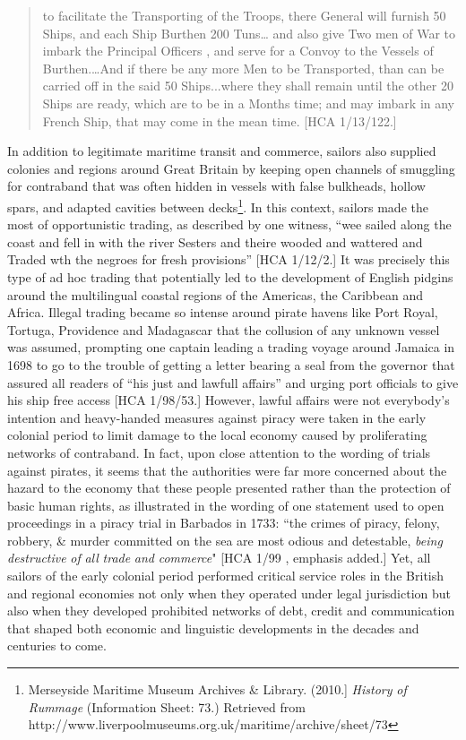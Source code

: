 \begin{quotation}
to facilitate the Transporting of the Troops, there General will furnish 50 Ships, and each Ship Burthen 200 Tuns… and also give Two men of War to imbark the Principal Officers , and serve for a Convoy to the Vessels of Burthen.…And if there be any more Men to be Transported, than can be carried off in the said 50 Ships...where they shall remain until the other 20 Ships are ready, which are to be in a Months time; and may imbark in any French Ship, that may come in the mean time. [HCA 1/13/122.]\end{quotation}

In addition to legitimate maritime transit and commerce, sailors also supplied colonies and regions around Great Britain by keeping open channels of smuggling for contraband that was often hidden in vessels with false bulkheads, hollow spars, and adapted cavities between decks\footnote{Merseyside Maritime Museum Archives \& Library. (2010.]  \textit{History} \textit{of} \textit{Rummage} (Information Sheet: 73.) Retrieved from http://www.liverpoolmuseums.org.uk/maritime/archive/sheet/73}. In this context, sailors made the most of opportunistic trading, as described by one witness, “wee sailed along the coast and fell in with the river Sesters and theire wooded and wattered and Traded wth the negroes for fresh provisions” [HCA 1/12/2.] It was precisely this type of ad hoc trading that potentially led to the development of English pidgins around the multilingual coastal regions of the Americas, the Caribbean and Africa. Illegal trading became so intense around pirate havens like Port Royal, Tortuga, Providence and Madagascar that the collusion of any unknown vessel was assumed, prompting one captain leading a trading voyage around Jamaica in 1698 to go to the trouble of getting a letter bearing a seal from the governor that assured all readers of “his just and lawfull affairs” and urging port officials to give his ship free access [HCA 1/98/53.] However, lawful affairs were not everybody’s intention and heavy-handed measures against piracy were taken in the early colonial period to limit damage to the local economy caused by proliferating networks of contraband. In fact, upon close attention to the wording of trials against pirates, it seems that the authorities were far more concerned about the hazard to the economy that these people presented rather than the protection of basic human rights, as illustrated in the wording of one statement used to open proceedings in a piracy trial in Barbados in 1733: “the crimes of piracy, felony, robbery, \& murder committed on the sea are most odious and detestable, \textit{being} \textit{destructive} \textit{of} \textit{all} \textit{trade} \textit{and} \textit{commerce}" [HCA 1/99 \citealt{Barbados1733}, emphasis added.] Yet, all sailors of the early colonial period performed critical service roles in the British and regional economies not only when they operated under legal jurisdiction but also when they developed prohibited networks of debt, credit and communication that shaped both economic and linguistic developments in the decades and centuries to come. 


